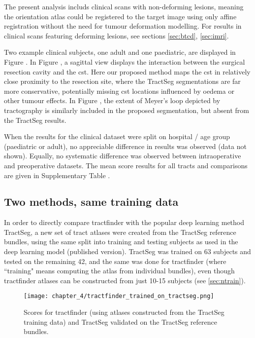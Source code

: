 The present analysis includs clinical scans with non-deforming lesions, meaning the orientation atlas could be registered to the target image using only affine registration without the need for tumour deformation modelling.
For results in clinical scans featuring deforming lesions, see sections \ref{sec:btcd}, \ref{sec:imri}. %

Two example clinical subjects, one adult and one paediatric, are displayed in Figure .
In Figure , a sagittal view displays the interaction between the surgical resection cavity and the \gls{cst}.
Here our proposed method maps the \gls{cst} in relatively close proximity to the resection site, where the TractSeg segmentations are far more conservative, potentially missing \gls{cst} locations influenced by oedema or other tumour effects.
In Figure , the extent of Meyer's loop depicted by tractography is similarly included in the proposed segmentation, but absent from the TractSeg results.

When the results for the clinical dataset were split on hospital / age group (paediatric or adult), no appreciable difference in results was observed (data not shown).
Equally, no systematic difference was observed between intraoperative and preoperative datasets.
The mean score results for all tracts and comparisons are given in Supplementary Table .

\subsection{Two methods, same training data}

In order to directly compare tractfinder with the popular deep learning method TractSeg, a new set of tract atlases were created from the TractSeg reference bundles, using the same split into training and testing subjects as used in the deep learning model (published version).
TractSeg was trained on 63 subjects and tested on the remaining 42, and the same was done for tractfinder (where ``training" means computing the atlas from individual bundles), even though tractfinder atlases can be constructed from just 10-15 subjects (see \ref{sec:ntrain}).

\begin{figure}[htb!]
  \texttt{[image: chapter\_4/tractfinder\_trained\_on\_tractseg.png]}
  \caption{Scores for tractfinder (using atlases constructed from the TractSeg training data) and TractSeg validated on the TractSeg reference bundles.}
  \label{fig:ts_atlas}
\end{figure}

